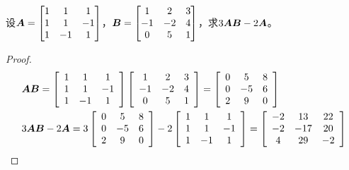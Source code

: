 \begin{problem}\label{problem-1.2}
设\(\boldsymbol{A}=\begin{bmatrix}
    1 & 1  & 1  \\
    1 & 1  & -1 \\
    1 & -1 & 1
\end{bmatrix}\)，\(\boldsymbol{B}=\begin{bmatrix}
    1  & 2  & 3 \\
    -1 & -2 & 4 \\
    0  & 5  & 1
\end{bmatrix}\)，求\(3\boldsymbol{A}\boldsymbol{B}-2\boldsymbol{A}\)。
\end{problem}
\begin{proof}
    \begin{align*}
         & \boldsymbol{A}\boldsymbol{B}           =
        \left[\begin{array}{ccc}
                      1 & 1  & 1  \\
                      1 & 1  & -1 \\
                      1 & -1 & 1
                  \end{array}\right]
        \left[\begin{array}{ccc}
                      1  & 2  & 3 \\
                      -1 & -2 & 4 \\
                      0  & 5  & 1
                  \end{array}\right]=
        \left[\begin{array}{ccc}
                      0 & 5  & 8 \\
                      0 & -5 & 6 \\
                      2 & 9  & 0
                  \end{array}\right]  \\
         & 3\boldsymbol{A}\boldsymbol{B}-2 \boldsymbol{A}  =
        3\left[\begin{array}{ccc}
                       0 & 5  & 8 \\
                       0 & -5 & 6 \\
                       2 & 9  & 0
                   \end{array}\right]
        -2\left[\begin{array}{ccc}
                        1 & 1  & 1  \\
                        1 & 1  & -1 \\
                        1 & -1 & 1
                    \end{array}\right]
        =\left[\begin{array}{ccc}
                       -2 & 13  & 22 \\
                       -2 & -17 & 20 \\
                       4  & 29  & -2
                   \end{array}\right]
    \end{align*}
\end{proof}

